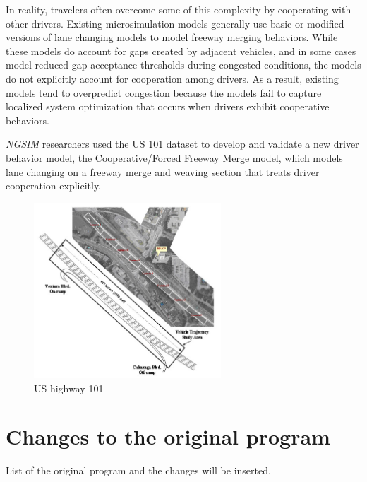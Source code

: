 In reality, travelers often overcome some of this complexity by cooperating with other drivers. Existing microsimulation models generally use basic or modified versions of lane changing models to model freeway merging behaviors. While these models do account for gaps created by adjacent vehicles, and in some cases model reduced gap acceptance thresholds during congested conditions, the models do not explicitly account for cooperation among drivers. As a result, existing models tend to overpredict congestion because the models fail to capture localized system optimization that occurs when drivers exhibit cooperative behaviors.

{\it NGSIM} researchers used the US 101 dataset to develop and validate a new driver behavior model, the Cooperative/Forced Freeway Merge model, which models lane changing on a freeway merge and weaving section that treats driver cooperation explicitly.

\begin{figure}[H]
\begin{center}
\includegraphics[width=7cm]{./figures/07030fig1.jpg}
\caption{US highway 101}
\label{fig:pict_us101}
\end{center}
\end{figure}







\section{Changes to the original program}


List of the original program and the changes will be inserted.

